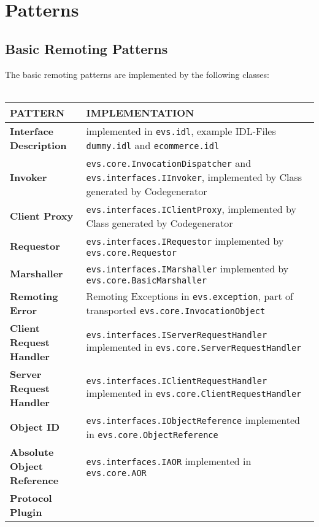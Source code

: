 \documentclass[a4paper]{article}
\begin{document}
\section*{Patterns}
\vspace{1cm}
\subsection*{Basic Remoting Patterns}
The basic remoting patterns are implemented by the following classes:\\\\

\begin{tabular}{| l | l |}\hline
\textbf{PATTERN} & \textbf{IMPLEMENTATION}\\\hline\hline
\textbf{Interface Description} & implemented in \texttt{evs.idl}, example IDL-Files \texttt{dummy.idl} and \texttt{ecommerce.idl} \\\hline
\textbf{Invoker} & \texttt{evs.core.InvocationDispatcher} and \texttt{evs.interfaces.IInvoker}, implemented by Class generated by Codegenerator\\\hline
\textbf{Client Proxy} & \texttt{evs.interfaces.IClientProxy}, implemented by Class generated by Codegenerator\\\hline
\textbf{Requestor} & \texttt{evs.interfaces.IRequestor} implemented by \texttt{evs.core.Requestor}\\\hline
\textbf{Marshaller} & \texttt{evs.interfaces.IMarshaller} implemented by \texttt{evs.core.BasicMarshaller}\\\hline
\textbf{Remoting Error} & Remoting Exceptions in \texttt{evs.exception}, part of transported \texttt{evs.core.InvocationObject}\\\hline
\textbf{Client Request Handler} & \texttt{evs.interfaces.IServerRequestHandler} implemented in \texttt{evs.core.ServerRequestHandler}\\\hline
\textbf{Server Request Handler} & \texttt{evs.interfaces.IClientRequestHandler} implemented in \texttt{evs.core.ClientRequestHandler}\\\hline
\textbf{Object ID} & \texttt{evs.interfaces.IObjectReference} implemented in \texttt{evs.core.ObjectReference}\\\hline
\textbf{Absolute Object Reference} & \texttt{evs.interfaces.IAOR} implemented in \texttt{evs.core.AOR}\\\hline
\textbf{Protocol Plugin} & \\\hline
\end{tabular}
\end{document}
